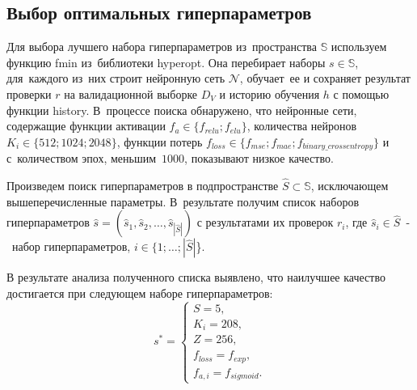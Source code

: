 \subsection{Выбор оптимальных гиперпараметров}\label{subsec:opt_hyper}

Для выбора лучшего набора гиперпараметров из~пространства $\mathbb{S}$ используем функцию fmin\cite[раздел FMin]{bib:hyperopt} из~библиотеки hyperopt.
Она перебирает наборы $s \in \mathbb{S}$, для~каждого из~них строит нейронную сеть $\mathcal{N}$, обучает~ее
и сохраняет результат проверки $r$ на валидационной выборке $D_V$ и историю обучения $h$ с помощью функции history\cite[раздел callbacks]{bib:keras}.
В~процессе поиска обнаружено, что нейронные сети, содержащие функции активации  $f_a \in \{f_{relu}; f_{elu}\}$, количества нейронов $K_i \in \{512; 1024; 2048\}$, функции потерь $f_{loss} \in \{f_{mse}; f_{mae}; f_{binary\_crossentropy}\}$ и с~количеством эпох, меньшим~$1000$, показывают низкое качество.

Произведем поиск гиперпараметров в подпространстве $\hat{S} \subset \mathbb{S}$, исключающем вышеперечисленные параметры.
В~результате получим список наборов гиперпараметров $\widehat{s} = (\widehat{s}_1, \widehat{s}_2, \dots, \widehat{s}_{|\hat{S}|})$ с результатами их проверок $r_i$,
где $\widehat{s}_i \in \hat{S}$~-~набор гиперпараметров, $i \in \{1; \dots; |\hat{S}|$\}.

В результате анализа полученного списка выявлено, что наилучшее качество достигается при следующем наборе гиперпараметров:
\begin{equation}\label{eq:hyper_set}
    s^* =
    \begin{cases}
        S = 5, \\
        K_i = 208, \\
        Z = 256, \\
        f_{loss} = f_{exp}, \\
        f_{a,i} = f_{sigmoid}.
    \end{cases}
\end{equation}


\newpage 